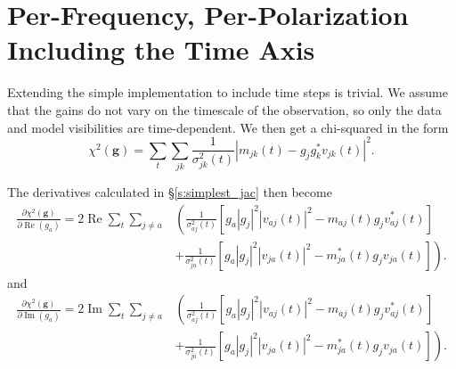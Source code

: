 \documentclass{article}
\newcommand\re{\operatorname{Re}}
\newcommand\im{\operatorname{Im}}
\begin{document}
\section{Per-Frequency, Per-Polarization Including the Time Axis}

Extending the simple implementation to include time steps is trivial. We assume that the gains do not vary on the timescale of the observation, so only the data and model visibilities are time-dependent. We then get a chi-squared in the form
\begin{equation}
    \chi^2(\boldsymbol{g}) = \sum_t \sum_{jk} \frac{1}{\sigma_{jk}^2(t)} \left| m_{jk}(t) - g_j g_k^* v_{jk}(t) \right|^2.
\end{equation}

The derivatives calculated in \S\ref{s:simplest_jac} then become
\begin{equation}
\begin{split}
    \frac{\partial \chi^2(\boldsymbol{g})}{\partial \re(g_a)} = 2 \re \sum_t \sum_{j \ne a} 
    & \left( \frac{1}{\sigma_{aj}^2(t)} \left[ g_a |g_j|^2 |v_{aj}(t)|^2 - m_{aj}(t) g_j v_{aj}^*(t) \right] \right. \\
    &\left. + \frac{1}{\sigma_{ja}^2(t)} \left[ g_a |g_j|^2 |v_{ja}(t)|^2 - m_{ja}^*(t) g_j v_{ja}(t) \right] \right).
\end{split}
\end{equation}
and
\begin{equation}
\begin{split}
    \frac{\partial \chi^2(\boldsymbol{g})}{\partial \im(g_a)} = 2 \im \sum_t \sum_{j \ne a} 
    & \left( \frac{1}{\sigma_{aj}^2(t)} \left[ g_a |g_j|^2 |v_{aj}(t)|^2 - m_{aj}(t) g_j v_{aj}^*(t) \right] \right. \\
    &\left. + \frac{1}{\sigma_{ja}^2(t)} \left[ g_a |g_j|^2 |v_{ja}(t)|^2 - m_{ja}^*(t) g_j v_{ja}(t) \right] \right).
\end{split}
\end{equation}
\end{document}
